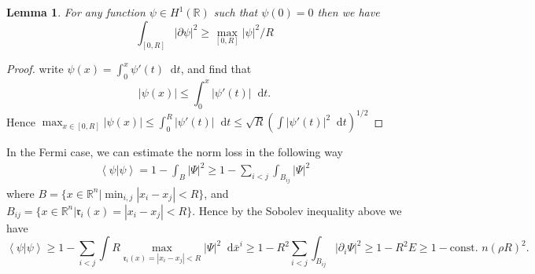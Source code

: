 \documentclass[a4paper,11pt]{article}
\newcommand{\abs}[1]{\left\lvert #1 \right\rvert}
\newcommand{\dom}[1]{\mathscr D\left(#1\right)}
\renewcommand{\braket}[1]{\left\langle#1\right\rangle}
\newcommand*\diff{\mathop{}\!\mathrm{d}}
\newcommand{\R}{\mathbb{R}}
\newtheorem{lemma}{Lemma}
\numberwithin{equation}{section}
\begin{document}
	\begin{lemma}
		For any function $ \psi\in H^1(\R) $ such that $ \psi(0)=0 $ then we have\begin{equation}\label{EqSobolevIneq}
			\int_{[0,R]}\abs{\partial\psi}^2\geq \max_{[0,R]}\abs{\psi}^2/R
		\end{equation}
	\end{lemma}
	\begin{proof}
		write $ \psi(x)=\int_{0}^{x}\psi'(t)\diff t $, and find that \begin{equation}
		\abs{\psi(x)}\leq \int_{0}^{x}\abs{\psi'(t)}\diff t.
		\end{equation}
		Hence $ \max_{x\in[0,R]}\abs{\psi(x)}\leq \int_{0}^{R}\abs{\psi'(t)}\diff t\leq \sqrt{R}\left(\int\abs{\psi'(t)}^2\diff t\right)^{1/2} $
	\end{proof}
		In the Fermi case, we can estimate the norm loss in the following way
		\begin{equation}
		\begin{aligned}
		\braket{\psi|\psi}=1-\int_{B}\abs{\Psi}^2\geq 1-\sum_{i<j}\int_{B_{ij}}\abs{\Psi}^2
		\end{aligned}
		\end{equation}
		where $ B=\{x\in\R^n\vert \min_{i,j}\abs{x_i-x_j}<R \} $, and $ B_{ij}=\{x\in\R^n \vert \mathfrak{r}_i(x)=\abs{x_i-x_j}<R \} $. Hence by the Sobolev inequality above we have \begin{equation}
		\braket{\psi |\psi }\geq 1- \sum_{i<j}\int R \max_{\mathfrak{r}_i(x)=\abs{x_i-x_j}<R}\abs{\Psi}^2 \diff \bar{x}^i\geq 1-R^2\sum_{i<j}\int_{B_{ij}}\abs{\partial_i\Psi}^2\geq 1- R^2 E\geq 1-\text{const. }n(\rho R)^2.
		\end{equation}
\end{document}

